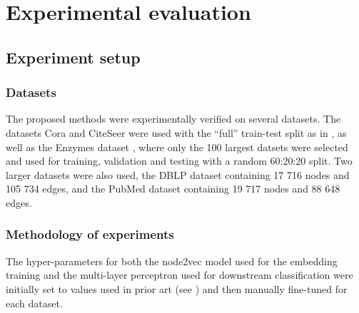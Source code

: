 \section{Experimental evaluation}

\subsection{Experiment setup}

\subsubsection{Datasets}

The proposed methods were experimentally verified on several datasets. The datasets Cora and CiteSeer \cite{yang_revisiting_2016} were used with the \enquote{full} train-test split as in \cite{chen_fastgcn_2018}, as well as the Enzymes dataset \cite{morris_tudataset_2020}, where only the 100 largest datsets were selected and used for training, validation and testing with a random 60:20:20 split. Two larger datasets were also used, the DBLP dataset \cite{bojchevski_deep_2018} containing 17 716 nodes and 105 734 edges, and the PubMed dataset \cite{yang_revisiting_2016} containing 19 717 nodes and 88 648 edges.

\subsubsection{Methodology of experiments}

The hyper-parameters for both the node2vec model used for the embedding training and the multi-layer perceptron used for downstream classification were initially set to values used in prior art (see \cite{hu_open_2021, fey_fast_2019}) and then manually fine-tuned for each dataset.

